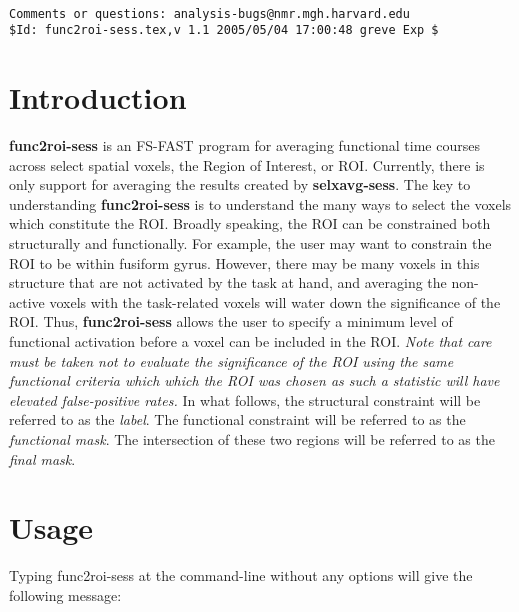 \documentclass[10pt]{article}
\begin{document}
\begin{Large}
 \\
\end{Large}

\noindent 
\begin{verbatim}
Comments or questions: analysis-bugs@nmr.mgh.harvard.edu
$Id: func2roi-sess.tex,v 1.1 2005/05/04 17:00:48 greve Exp $
\end{verbatim}

\section{Introduction}

{\bf func2roi-sess} is an FS-FAST program for averaging functional
time courses across select spatial voxels, the Region of Interest, or
ROI. Currently, there is only support for averaging the results
created by {\bf selxavg-sess}.  The key to understanding {\bf
func2roi-sess} is to understand the many ways to select the voxels
which constitute the ROI. Broadly speaking, the ROI can be constrained
both structurally and functionally. For example, the user may want to
constrain the ROI to be within fusiform gyrus. However, there may be
many voxels in this structure that are not activated by the task at
hand, and averaging the non-active voxels with the task-related voxels
will water down the significance of the ROI.  Thus, {\bf
func2roi-sess} allows the user to specify a minimum level of
functional activation before a voxel can be included in the ROI. {\em
Note that care must be taken not to evaluate the significance of the
ROI using the same functional criteria which which the ROI was chosen
as such a statistic will have elevated false-positive rates.} In what
follows, the structural constraint will be referred to as the {\em
label}.  The functional constraint will be referred to as the {\em
functional mask}.  The intersection of these two regions will be
referred to as the {\em final mask}.

\section{Usage}
Typing func2roi-sess at the command-line without any options will give the
following message:\\ 
\end{document}
